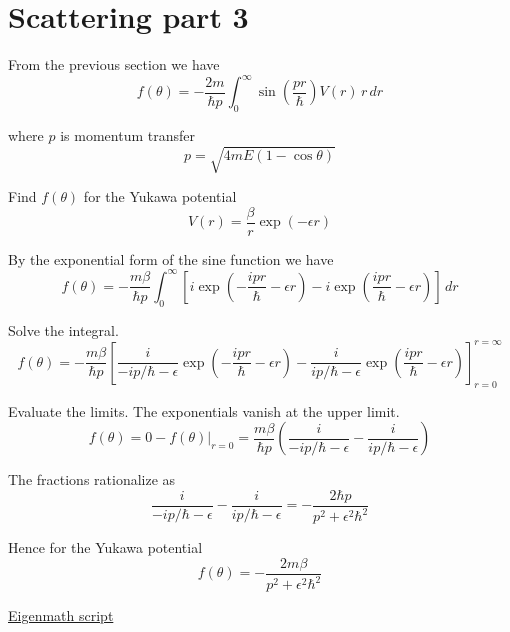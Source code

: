 

\section*{Scattering part 3}

From the previous section we have
\begin{equation*}
f(\theta)=-\frac{2m}{\hbar p}\int_0^\infty\sin\left(\frac{pr}{\hbar}\right)V(r)\,r\,dr
\end{equation*}

where $p$ is momentum transfer
\begin{equation*}
p=\sqrt{4mE(1-\cos\theta)}
\end{equation*}

Find $f(\theta)$ for the Yukawa potential
\begin{equation*}
V(r)=\frac{\beta}{r}\exp(-\epsilon r)
\end{equation*}

By the exponential form of the sine function we have
\begin{equation*}
f(\theta)=-\frac{m\beta}{\hbar p}\int_0^\infty
\left[
i\exp\left(-\frac{ipr}{\hbar}-\epsilon r\right)
-i\exp\left(\frac{ipr}{\hbar}-\epsilon r\right)
\right]\,dr
\end{equation*}

Solve the integral.
\begin{equation*}
f(\theta)=-\frac{m\beta}{\hbar p}
\left[
\frac{i}{-ip/\hbar-\epsilon}\exp\left(-\frac{ipr}{\hbar}-\epsilon r\right)
-\frac{i}{ip/\hbar-\epsilon}\exp\left(\frac{ipr}{\hbar}-\epsilon r\right)
\right]_{r=0}^{r=\infty}
\end{equation*}

Evaluate the limits. The exponentials vanish at the upper limit.
\begin{equation*}
f(\theta)=0-f(\theta)\bigg|_{r=0}
=\frac{m\beta}{\hbar p}
\left(\frac{i}{-ip/\hbar-\epsilon}-\frac{i}{ip/\hbar-\epsilon}\right)
\end{equation*}

The fractions rationalize as
\begin{equation*}
\frac{i}{-ip/\hbar-\epsilon}-\frac{i}{ip/\hbar-\epsilon}=-\frac{2\hbar p}{p^2+\epsilon^2\hbar^2}
\end{equation*}

Hence for the Yukawa potential
\begin{equation*}
f(\theta)=-\frac{2m\beta}{p^2+\epsilon^2\hbar^2}
\end{equation*}

\href{https://georgeweigt.github.io/examples/scattering-part-3-demo.html}{Eigenmath script}


